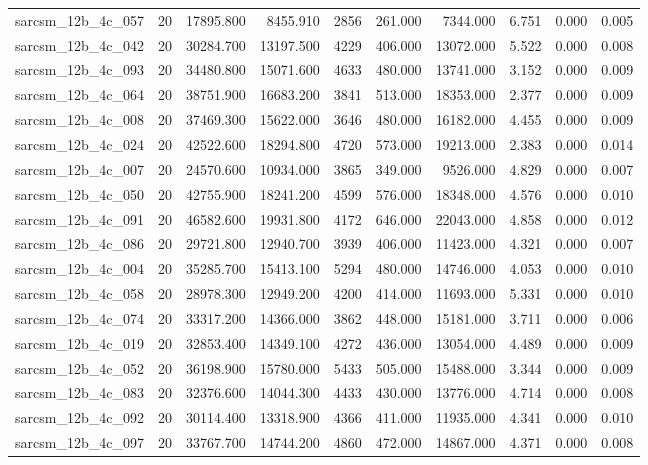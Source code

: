 \begin{tabular}{lrrrrrrrrr}
sarcsm\_12b\_4c\_057 & 20 & 17895.800 & 8455.910 & 2856 & 261.000 & 7344.000 & 6.751 & 0.000 & 0.005 \\
sarcsm\_12b\_4c\_042 & 20 & 30284.700 & 13197.500 & 4229 & 406.000 & 13072.000 & 5.522 & 0.000 & 0.008 \\
sarcsm\_12b\_4c\_093 & 20 & 34480.800 & 15071.600 & 4633 & 480.000 & 13741.000 & 3.152 & 0.000 & 0.009 \\
sarcsm\_12b\_4c\_064 & 20 & 38751.900 & 16683.200 & 3841 & 513.000 & 18353.000 & 2.377 & 0.000 & 0.009 \\
sarcsm\_12b\_4c\_008 & 20 & 37469.300 & 15622.000 & 3646 & 480.000 & 16182.000 & 4.455 & 0.000 & 0.009 \\
sarcsm\_12b\_4c\_024 & 20 & 42522.600 & 18294.800 & 4720 & 573.000 & 19213.000 & 2.383 & 0.000 & 0.014 \\
sarcsm\_12b\_4c\_007 & 20 & 24570.600 & 10934.000 & 3865 & 349.000 & 9526.000 & 4.829 & 0.000 & 0.007 \\
sarcsm\_12b\_4c\_050 & 20 & 42755.900 & 18241.200 & 4599 & 576.000 & 18348.000 & 4.576 & 0.000 & 0.010 \\
sarcsm\_12b\_4c\_091 & 20 & 46582.600 & 19931.800 & 4172 & 646.000 & 22043.000 & 4.858 & 0.000 & 0.012 \\
sarcsm\_12b\_4c\_086 & 20 & 29721.800 & 12940.700 & 3939 & 406.000 & 11423.000 & 4.321 & 0.000 & 0.007 \\
sarcsm\_12b\_4c\_004 & 20 & 35285.700 & 15413.100 & 5294 & 480.000 & 14746.000 & 4.053 & 0.000 & 0.010 \\
sarcsm\_12b\_4c\_058 & 20 & 28978.300 & 12949.200 & 4200 & 414.000 & 11693.000 & 5.331 & 0.000 & 0.010 \\
sarcsm\_12b\_4c\_074 & 20 & 33317.200 & 14366.000 & 3862 & 448.000 & 15181.000 & 3.711 & 0.000 & 0.006 \\
sarcsm\_12b\_4c\_019 & 20 & 32853.400 & 14349.100 & 4272 & 436.000 & 13054.000 & 4.489 & 0.000 & 0.009 \\
sarcsm\_12b\_4c\_052 & 20 & 36198.900 & 15780.000 & 5433 & 505.000 & 15488.000 & 3.344 & 0.000 & 0.009 \\
sarcsm\_12b\_4c\_083 & 20 & 32376.600 & 14044.300 & 4433 & 430.000 & 13776.000 & 4.714 & 0.000 & 0.008 \\
sarcsm\_12b\_4c\_092 & 20 & 30114.400 & 13318.900 & 4366 & 411.000 & 11935.000 & 4.341 & 0.000 & 0.010 \\
sarcsm\_12b\_4c\_097 & 20 & 33767.700 & 14744.200 & 4860 & 472.000 & 14867.000 & 4.371 & 0.000 & 0.008 \\

\end{tabular}
